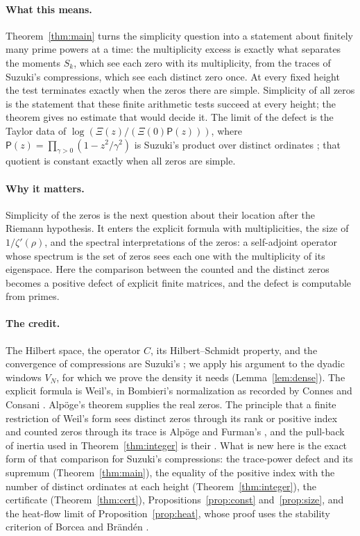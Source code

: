 \documentclass[11pt,a4paper]{article}
\theoremstyle{plain}
\theoremstyle{remark}
\begin{document}
\paragraph{What this means.}
Theorem~\ref{thm:main} turns the simplicity question into a statement about finitely many prime powers at a time: the
multiplicity excess is exactly what separates the moments $S_k$, which see each zero with its multiplicity, from the
traces of Suzuki's compressions, which see each distinct zero once. At every fixed height the test terminates exactly
when the zeros there are simple. Simplicity of all zeros is the statement that these finite arithmetic tests succeed
at every height; the theorem gives no estimate that would decide it. The limit of the defect is the Taylor data of
$\log(\Xi(z)/(\Xi(0)\mathsf P(z)))$, where $\mathsf P(z)=\prod_{\gamma>0}(1-z^2/\gamma^2)$ is Suzuki's product over
distinct ordinates \cite[Theorem~1.2]{suzuki}; that quotient is constant exactly when all zeros are simple.

\paragraph{Why it matters.}
Simplicity of the zeros is the next question about their location after the Riemann hypothesis. It enters the
explicit formula with multiplicities, the size of $1/\zeta'(\rho)$, and the spectral interpretations of the zeros:
a self-adjoint operator whose spectrum is the set of zeros sees each one with the multiplicity of its eigenspace. Here
the comparison between the counted and the distinct zeros becomes a positive defect of explicit finite matrices, and
the defect is computable from primes.

\paragraph{The credit.}
The Hilbert space, the operator $C$, its Hilbert--Schmidt property, and the convergence of compressions are
Suzuki's \cite[§2.3, (4.1), Theorem~3.3]{suzuki}; we apply his argument to the dyadic windows $V_N$, for which we
prove the density it needs (Lemma~\ref{lem:dense}). The explicit formula is Weil's, in Bombieri's normalization as
recorded by Connes and Consani \cite[Appendix, Explicit formula]{cc-weil}. Alp\"oge's theorem \cite{alpoge}
supplies the real zeros. The principle that a finite restriction of Weil's form sees distinct zeros through its
rank or positive index and counted zeros through its trace is Alp\"oge and Furman's \cite[Proposition~4.1,
p.~6]{alpoge-furman}, and the pull-back of inertia used in Theorem~\ref{thm:integer} is their
\cite[Lemma~3.1, p.~5]{alpoge-furman}. What is new here is the exact form of that comparison for Suzuki's
compressions: the trace-power defect and its supremum (Theorem~\ref{thm:main}), the equality of the positive index
with the number of distinct ordinates at each height (Theorem~\ref{thm:integer}), the certificate
(Theorem~\ref{thm:cert}), Propositions~\ref{prop:const} and~\ref{prop:size}, and the heat-flow limit of
Proposition~\ref{prop:heat}, whose proof uses the stability criterion of Borcea and Br\"and\'en \cite{bb}.
\end{document}

